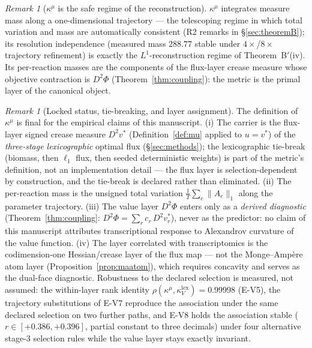 \documentclass[11pt,a4paper]{article}
\theoremstyle{plain}
\theoremstyle{definition}
\theoremstyle{remark}
\newtheorem{remark}[theorem]{Remark}
\newcommand{\kk}{\kappa_{\!V}}
\newcommand{\kmu}{\kappa^{\mu}}
\begin{document}
\begin{remark}[$\kmu$ is the safe regime of the reconstruction]
$\kmu$ integrates measure mass along a one-dimensional trajectory --- the
telescoping regime in which total variation and mass are automatically
consistent (R2 remarks in \S\ref{sec:theoremB}); its resolution
independence (measured mass $288.77$ stable under $4\times$/$8\times$
trajectory refinement) is exactly the $L^1$-reconstruction regime of
Theorem~B$'$(iv). Its per-reaction masses are the components of the
flux-layer crease measure whose objective contraction is $D^2\Phi$
(Theorem~\ref{thm:coupling}): the metric is the primal layer of the
canonical object.
\end{remark}

\begin{remark}[Locked status, tie-breaking, and layer assignment]
\label{rem:lock}
The definition of $\kmu$ is final for the empirical claims of this
manuscript. (i) The carrier is the flux-layer signed crease measure
$D^2 v^*$ (Definition~\ref{def:mu} applied to $u = v^*$) of the
\emph{three-stage lexicographic} optimal flux (\S\ref{sec:methods});
the lexicographic tie-break (biomass, then $\ell_1$ flux, then seeded
deterministic weights) is part of the metric's definition, not an
implementation detail --- the flux layer is selection-dependent by
construction, and the tie-break is declared rather than eliminated.
(ii) The per-reaction mass is the unsigned total variation
$\frac{1}{T}\sum_e \|A_e\|_1$ along the parameter trajectory.
(iii) The value layer $D^2\Phi$ enters only as a \emph{derived
diagnostic} (Theorem~\ref{thm:coupling}:
$D^2\Phi = \sum_r c_r\, D^2 v^*_r$), never as the predictor: no claim
of this manuscript attributes transcriptional response to Alexandrov
curvature of the value function. (iv) The layer correlated with
transcriptomics is the codimension-one Hessian/crease layer of the
flux map --- not the Monge--Amp\`ere atom layer
(Proposition~\ref{prop:maatom}), which requires concavity and serves
as the dual-face diagnostic. Robustness to the declared selection is
measured, not assumed: the within-layer rank identity
$\rho(\kmu, \kk^{\mathrm{lex}}) = 0.99998$ (E-V5), the trajectory
substitutions of E-V7 reproduce the association under the same
declared selection on two further paths, and E-V8 holds the
association stable ($r \in [+0.386, +0.396]$, partial constant to
three decimals) under four alternative stage-3 selection rules while
the value layer stays exactly invariant.
\end{remark}
\end{document}
